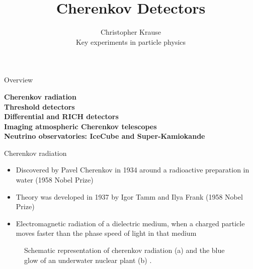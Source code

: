 \documentclass[aspectratio=1610, 10pt]{beamer}
\title{\Large{Cherenkov Detectors}}
\author[C.~Krause]{\normalsize{Christopher Krause \\
Key experiments in particle physics}}
\begin{document}
\maketitle

\begin{frame}{Overview}
  \begin{large}
    \Large \textbf{Cherenkov radiation} \\
    \vspace{0.5cm}
    \textbf{Threshold detectors} \\
    \vspace{0.5cm}
    \textbf{Differential and RICH detectors} \\
    \vspace{0.5cm}
    \textbf{Imaging atmospheric Cherenkov telescopes} \\
    \vspace{0.5cm}
    \textbf{Neutrino observatories: IceCube and Super-Kamiokande} \\
\end{large}
\end{frame}

\begin{frame}{Cherenkov radiation}
  \begin{itemize}
    \item Discovered by Pavel Cherenkov in 1934 around a radioactive preparation in water (1958 Nobel Prize)
    \item Theory was developed in 1937 by Igor Tamm and Ilya Frank (1958 Nobel Prize)
    \item Electromagnetic radiation of a dielectric medium, when a charged particle moves
    faster than the phase speed of light in that medium
  \end{itemize}
  \begin{figure}
      \hspace{1cm}
  \caption{Schematic representation of cherenkov radiation (a) and the blue glow of an underwater nuclear plant (b) \cite{cone}\cite{atr}.}
  \end{figure}
\end{frame}
\end{document}
